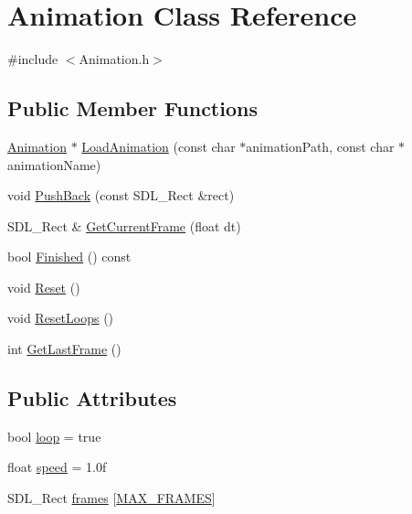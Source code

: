 \hypertarget{class_animation}{}\section{Animation Class Reference}
\label{class_animation}


{\ttfamily \#include $<$Animation.\+h$>$}

\subsection*{Public Member Functions}
\begin{DoxyCompactItemize}
\item 
\mbox{\hyperlink{class_animation}{Animation}} $\ast$ \mbox{\hyperlink{class_animation_a0d759aa2e42ea4f5192be298a8806d00}{Load\+Animation}} (const char $\ast$animation\+Path, const char $\ast$animation\+Name)
\item 
void \mbox{\hyperlink{class_animation_adff0991c58fb4e828ac9e4be2c05721a}{Push\+Back}} (const S\+D\+L\+\_\+\+Rect \&rect)
\item 
S\+D\+L\+\_\+\+Rect \& \mbox{\hyperlink{class_animation_a5d5417269b6065e251830ff1b8eaaf7e}{Get\+Current\+Frame}} (float dt)
\item 
bool \mbox{\hyperlink{class_animation_a792f854c907ce8ff6124d52aaad29277}{Finished}} () const
\item 
void \mbox{\hyperlink{class_animation_aa78f45d8a9f69eaed31031febb722594}{Reset}} ()
\item 
void \mbox{\hyperlink{class_animation_a31c11cf5d995a649502f26725f30670d}{Reset\+Loops}} ()
\item 
int \mbox{\hyperlink{class_animation_af2eaa1fed2dd359a1aa1743e204e9b30}{Get\+Last\+Frame}} ()
\end{DoxyCompactItemize}
\subsection*{Public Attributes}
\begin{DoxyCompactItemize}
\item 
bool \mbox{\hyperlink{class_animation_a951ff207e048c16b7c5dde293eb5419b}{loop}} = true
\item 
float \mbox{\hyperlink{class_animation_a68079384a94a0ebdba03241f1937608e}{speed}} = 1.\+0f
\item 
S\+D\+L\+\_\+\+Rect \mbox{\hyperlink{class_animation_af42671d4f015c2a11bf4af178ed357e0}{frames}} \mbox{[}\mbox{\hyperlink{_animation_8h_a5b4055201d2d8170e179b1ceaa438b9c}{M\+A\+X\+\_\+\+F\+R\+A\+M\+ES}}\mbox{]}
\end{DoxyCompactItemize}


